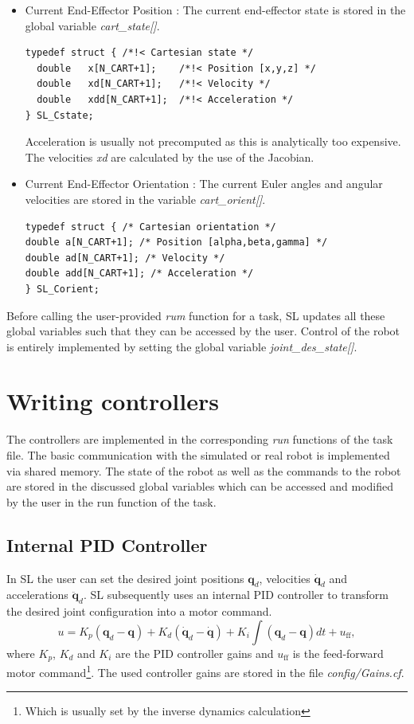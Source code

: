 \documentclass[11pt, article, colorback]{article}
\begin{document}
\begin{itemize}
\item Current End-Effector Position :
The current end-effector state is stored in the global variable {\em cart\_state[]}.
\begin{lstlisting}
typedef struct { /*!< Cartesian state */
  double   x[N_CART+1];    /*!< Position [x,y,z] */
  double   xd[N_CART+1];   /*!< Velocity */
  double   xdd[N_CART+1];  /*!< Acceleration */
} SL_Cstate;
\end{lstlisting}
Acceleration is usually not precomputed as this is analytically too expensive. The velocities {\em xd} are calculated by the use of the Jacobian. 

\item Current End-Effector Orientation :
The current Euler angles and angular velocities are stored in the variable {\em cart\_orient[]}. 
\begin{lstlisting}
typedef struct { /* Cartesian orientation */
double a[N_CART+1]; /* Position [alpha,beta,gamma] */
double ad[N_CART+1]; /* Velocity */
double add[N_CART+1]; /* Acceleration */
} SL_Corient;
\end{lstlisting}
\end{itemize}
Before calling the user-provided {\em rum} function for a task, SL updates all these global variables such that they can be accessed by the user. Control of the robot is entirely implemented by
setting the global variable {\em joint\_des\_state[]}.


\section{Writing controllers} 
The controllers are implemented in the corresponding {\em run} functions of the task file. The basic communication with the simulated or real robot is implemented via shared memory. The state of the robot as well as the commands
to the robot are stored in the discussed global variables which can be accessed and modified by the user in the run function of the task.

\subsection{Internal PID Controller \label{se:PID}}
In SL the user can set the desired joint positions $\mathbf{q}_d$, velocities $\dot{\mathbf{q}}_d$ and accelerations $\ddot{\mathbf{q}}_d$. SL subsequently uses an internal PID controller to transform the desired joint configuration into a motor command.
\begin{equation}
 u = K_p (\mathbf{q}_d - \mathbf{q}) + K_d  (\dot{\mathbf{q}}_d - \dot{\mathbf{q}}) + K_i \int (\mathbf{q}_d - \mathbf{q}) dt + u_{\textrm{ff}}, \label{eq:PID}
 \end{equation}
where $K_p$, $K_d$ and $K_i$ are the PID controller gains and $u_{\textrm{ff}}$ is the feed-forward motor command\footnote{Which is usually set by the inverse dynamics calculation}. The used controller gains are stored in the file
{\em config/Gains.cf}.
\end{document}
